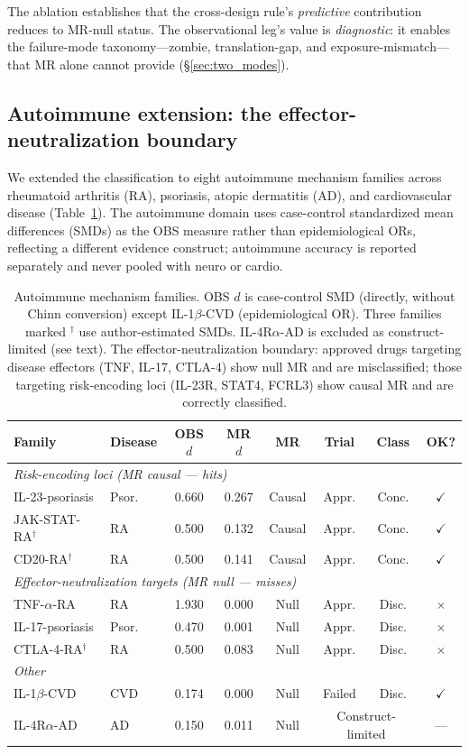 \documentclass[11pt]{article}
\begin{document}
The ablation establishes that the cross-design rule's \emph{predictive} contribution reduces to MR-null status. The observational leg's value is \emph{diagnostic}: it enables the failure-mode taxonomy---zombie, translation-gap, and exposure-mismatch---that MR alone cannot provide (\S\ref{sec:two_modes}).

\subsection{Autoimmune extension: the effector-neutralization boundary}
\label{sec:autoimmune}

We extended the classification to eight autoimmune mechanism families across rheumatoid arthritis (RA), psoriasis, atopic dermatitis (AD), and cardiovascular disease (Table~\ref{tab:autoimmune}). The autoimmune domain uses case-control standardized mean differences (SMDs) as the OBS measure rather than epidemiological ORs, reflecting a different evidence construct; autoimmune accuracy is reported separately and never pooled with neuro or cardio.

\begin{table}[t]
\centering
\caption{Autoimmune mechanism families. OBS $d$ is case-control SMD (directly, without Chinn conversion) except IL-1$\beta$-CVD (epidemiological OR). Three families marked $^\dagger$ use author-estimated SMDs. IL-4R$\alpha$-AD is excluded as construct-limited (see text). The effector-neutralization boundary: approved drugs targeting disease effectors (TNF, IL-17, CTLA-4) show null MR and are misclassified; those targeting risk-encoding loci (IL-23R, STAT4, FCRL3) show causal MR and are correctly classified.}
\label{tab:autoimmune}
\small
\begin{tabular}{llcccccc}
\toprule
Family & Disease & OBS $d$ & MR $d$ & MR & Trial & Class & OK? \\
\midrule
\multicolumn{8}{l}{\emph{Risk-encoding loci (MR causal --- hits)}} \\
IL-23-psoriasis & Psor. & 0.660 & 0.267 & Causal & Appr. & Conc. & $\checkmark$ \\
JAK-STAT-RA$^\dagger$ & RA & 0.500 & 0.132 & Causal & Appr. & Conc. & $\checkmark$ \\
CD20-RA$^\dagger$ & RA & 0.500 & 0.141 & Causal & Appr. & Conc. & $\checkmark$ \\
\midrule
\multicolumn{8}{l}{\emph{Effector-neutralization targets (MR null --- misses)}} \\
TNF-$\alpha$-RA & RA & 1.930 & 0.000 & Null & Appr. & Disc. & $\times$ \\
IL-17-psoriasis & Psor. & 0.470 & 0.001 & Null & Appr. & Disc. & $\times$ \\
CTLA-4-RA$^\dagger$ & RA & 0.500 & 0.083 & Null & Appr. & Disc. & $\times$ \\
\midrule
\multicolumn{8}{l}{\emph{Other}} \\
IL-1$\beta$-CVD & CVD & 0.174 & 0.000 & Null & Failed & Disc. & $\checkmark$ \\
IL-4R$\alpha$-AD & AD & 0.150 & 0.011 & Null & \multicolumn{2}{c}{Construct-limited} & --- \\
\bottomrule
\end{tabular}
\end{table}
\end{document}
